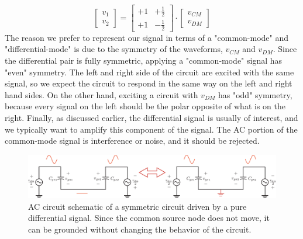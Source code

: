     \begin{equation}
    	\left[\begin{matrix}
    		v_{1}\\[0.1cm]
    		v_{2}
    	\end{matrix}\right]
    	=
    	\left[\begin{matrix}
    		+1 & +\frac{1}{2}\\[0.1cm]
    		+1 & -\frac{1}{2}
    	\end{matrix}\right]
    	\cdot
    	\left[\begin{matrix}
    		v_{CM}\\[0.1cm]
    		v_{DM}
    	\end{matrix}\right]
    \end{equation}  
The reason we prefer to represent our signal in terms of a "common-mode" and "differential-mode" is due to the symmetry of the waveforms, $v_{CM}$ and $v_{DM}$.  Since the differential pair is fully symmetric, applying a "common-mode" signal has "even" symmetry.  The left and right side of the circuit are excited with the same signal, so we expect the circuit to respond in the same way on the left and right hand sides.  On the other hand, exciting a circuit with $v_{DM}$ has "odd" symmetry, because every signal on the left should be the polar opposite of what is on the right.	Finally, as discussed earlier, the differential signal is usually of interest, and we typically want to amplify this component of the signal. The AC portion of the common-mode signal is interference or noise, and it should be rejected.  
\begin{figure}[t]
\centering
\includegraphics[width=\columnwidth]{DM_model}
\caption{AC circuit schematic of a symmetric circuit driven by a pure differential signal.  Since the common source node does not move, it can be grounded without changing the behavior of the circuit.}
\label{fig:DM_model}
\end{figure}
